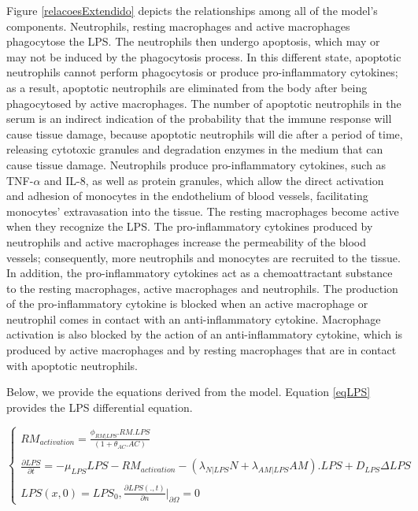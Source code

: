 \documentclass[10pt]{bmc_article}
\newenvironment{bmcformat}{\baselineskip20pt\sloppy\setboolean{publ}{false}}{\baselineskip20pt\sloppy}
\begin{document}
\begin{bmcformat}
Figure \ref{relacoesExtendido} depicts the relationships among all of the model's components. Neutrophils, resting macrophages and 
active macrophages phagocytose the LPS. The neutrophils then undergo apoptosis, which may or may not be induced by the phagocytosis 
process. In this different state, apoptotic neutrophils cannot perform phagocytosis or produce pro-inflammatory cytokines; as a result, 
apoptotic neutrophils are eliminated from the body after being phagocytosed by active macrophages. The number of apoptotic neutrophils 
in the serum is an indirect indication of the probability that the immune response will cause tissue damage, because apoptotic 
neutrophils will die after a period of time, releasing cytotoxic granules and degradation enzymes in the medium that can cause tissue 
damage. Neutrophils produce pro-inflammatory cytokines, such as TNF-$\alpha$ and IL-8, as well as protein granules, which allow the 
direct activation and adhesion of monocytes in the endothelium of blood vessels, facilitating monocytes' extravasation into the tissue. 
The resting macrophages become active when they recognize the LPS. The pro-inflammatory cytokines produced by neutrophils and active 
macrophages increase the permeability of the blood vessels; consequently, more neutrophils and monocytes are recruited to the tissue. 
In addition, the pro-inflammatory cytokines act as a chemoattractant substance to the resting macrophages, active macrophages and 
neutrophils. The production of the pro-inflammatory cytokine is blocked when an active macrophage or neutrophil comes in contact with 
an anti-inflammatory cytokine. Macrophage activation is also blocked by the action of an anti-inflammatory cytokine, which is produced 
by active macrophages and by resting macrophages that are in contact with apoptotic neutrophils. 



Below, we provide the equations derived from the model. Equation \ref{eqLPS} provides the LPS differential equation.

\begin{equation}
 \begin{cases} 
  RM_{activation} = \frac{\phi_{RM|LPS}.RM.LPS}{(1 + \theta_{AC}.AC)}\\ \\
  \frac{\partial LPS}{\partial t} = -\mu_{LPS} LPS - RM_{activation} -(\lambda_{N|LPS}N + \lambda_{AM|LPS}AM).LPS + D_{LPS}\Delta LPS  \\\\
  LPS(x,0) = LPS_0,\frac{\partial LPS(.,t)}{\partial n} |_{\partial\Omega} = 0 
\end{cases} 
\label{eqLPS}
\end{equation}


\end{bmcformat}
\end{document}
